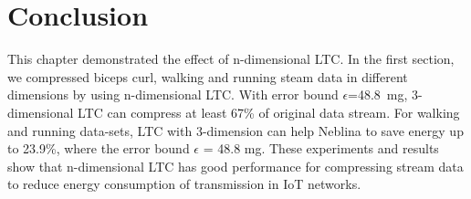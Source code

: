 \section{Conclusion}
This chapter demonstrated the effect of n-dimensional LTC. In the first section,
we compressed biceps curl, walking and running steam data in different
dimensions by using n-dimensional LTC. With error bound $\epsilon$=48.8\ mg,
3-dimensional LTC can compress at least 67\% of original data stream. For
walking and running data-sets, LTC with 3-dimension can help Neblina to save
energy up to 23.9\%, where the error bound $\epsilon$ = 48.8 mg. These
experiments and results show that n-dimensional LTC has good performance for
compressing stream data to reduce energy consumption of transmission in IoT
networks.
